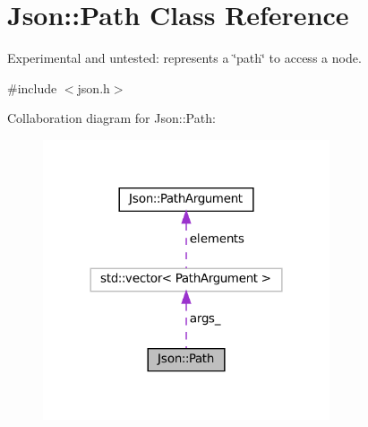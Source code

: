 \hypertarget{classJson_1_1Path}{}\section{Json\+:\+:Path Class Reference}
\label{classJson_1_1Path}


Experimental and untested\+: represents a \char`\"{}path\char`\"{} to access a node.  




{\ttfamily \#include $<$json.\+h$>$}



Collaboration diagram for Json\+:\+:Path\+:
\nopagebreak
\begin{figure}[H]
\begin{center}
\leavevmode
\includegraphics[width=240pt]{classJson_1_1Path__coll__graph}
\end{center}
\end{figure}
